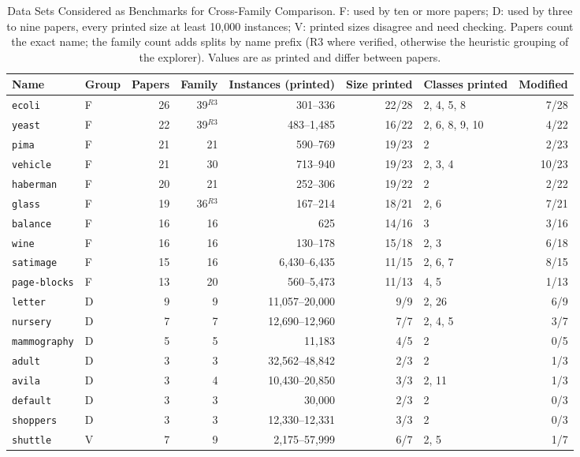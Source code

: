 \begin{table}[t]
\centering\small
\caption{Data Sets Considered as Benchmarks for Cross-Family Comparison.
F: used by ten or more papers; D: used by three to nine papers, every printed
size at least 10,000 instances; V: printed sizes disagree and need checking.
Papers count the exact name; the family count adds splits by name prefix
(R3 where verified, otherwise the heuristic grouping of the explorer).
Values are as printed and differ between papers.}
\label{tab:data-candidates}
\begin{tabular}{@{}llrrrrlr@{}}
\toprule
Name & Group & Papers & Family & Instances (printed) & Size printed & Classes printed & Modified\\
\midrule
\texttt{ecoli} & F & 26 & 39$^{R3}$ & 301--336 & 22/28 & 2, 4, 5, 8 & 7/28\\
\texttt{yeast} & F & 22 & 39$^{R3}$ & 483--1,485 & 16/22 & 2, 6, 8, 9, 10 & 4/22\\
\texttt{pima} & F & 21 & 21 & 590--769 & 19/23 & 2 & 2/23\\
\texttt{vehicle} & F & 21 & 30 & 713--940 & 19/23 & 2, 3, 4 & 10/23\\
\texttt{haberman} & F & 20 & 21 & 252--306 & 19/22 & 2 & 2/22\\
\texttt{glass} & F & 19 & 36$^{R3}$ & 167--214 & 18/21 & 2, 6 & 7/21\\
\texttt{balance} & F & 16 & 16 & 625 & 14/16 & 3 & 3/16\\
\texttt{wine} & F & 16 & 16 & 130--178 & 15/18 & 2, 3 & 6/18\\
\texttt{satimage} & F & 15 & 16 & 6,430--6,435 & 11/15 & 2, 6, 7 & 8/15\\
\texttt{page-blocks} & F & 13 & 20 & 560--5,473 & 11/13 & 4, 5 & 1/13\\
\texttt{letter} & D & 9 & 9 & 11,057--20,000 & 9/9 & 2, 26 & 6/9\\
\texttt{nursery} & D & 7 & 7 & 12,690--12,960 & 7/7 & 2, 4, 5 & 3/7\\
\texttt{mammography} & D & 5 & 5 & 11,183 & 4/5 & 2 & 0/5\\
\texttt{adult} & D & 3 & 3 & 32,562--48,842 & 2/3 & 2 & 1/3\\
\texttt{avila} & D & 3 & 4 & 10,430--20,850 & 3/3 & 2, 11 & 1/3\\
\texttt{default} & D & 3 & 3 & 30,000 & 2/3 & 2 & 0/3\\
\texttt{shoppers} & D & 3 & 3 & 12,330--12,331 & 3/3 & 2 & 0/3\\
\texttt{shuttle} & V & 7 & 9 & 2,175--57,999 & 6/7 & 2, 5 & 1/7\\
\bottomrule
\end{tabular}
\end{table}

